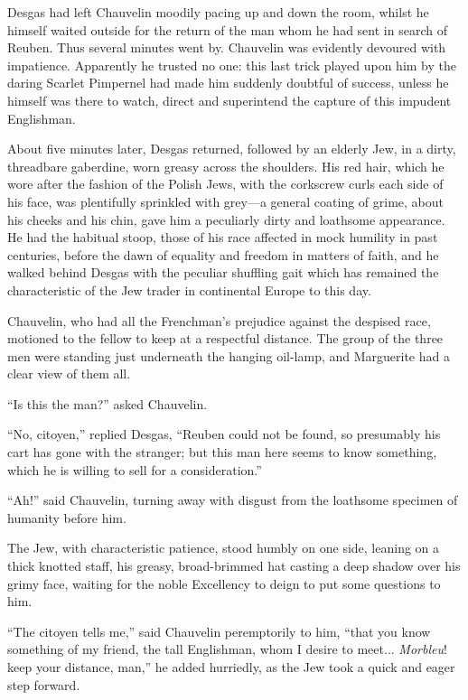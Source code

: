 \documentclass[paper=5.5in:8.5in,BCOR=7mm,twoside,DIV=calc,12pt,usegeometry,chapterprefix,endperiod,headings=big]{scrbook}
\begin{document}
Desgas had left Chauvelin moodily pacing up and down the room, whilst he himself waited outside for the return of the man whom he had sent in search of Reuben. Thus several minutes went by. Chauvelin was evidently devoured with impatience. Apparently he trusted no one: this last trick played upon him by the daring Scarlet Pimpernel had made him suddenly doubtful of success, unless he himself was there to watch, direct and superintend the capture of this impudent Englishman.

About five minutes later, Desgas returned, followed by an elderly Jew, in a dirty, threadbare gaberdine, worn greasy across the shoulders. His red hair, which he wore after the fashion of the Polish Jews, with the corkscrew curls each side of his face, was plentifully sprinkled with grey---a general coating of grime, about his cheeks and his chin, gave him a peculiarly dirty and loathsome appearance. He had the habitual stoop, those of his race affected in mock humility in past centuries, before the dawn of equality and freedom in matters of faith, and he walked behind Desgas with the peculiar shuffling gait which has remained the characteristic of the Jew trader in continental Europe to this day.

Chauvelin, who had all the Frenchman's prejudice against the despised race, motioned to the fellow to keep at a respectful distance. The group of the three men were standing just underneath the hanging oil-lamp, and Marguerite had a clear view of them all.

\enquote{Is this the man?} asked Chauvelin.

\enquote{No, citoyen,} replied Desgas, \enquote{Reuben could not be found, so presumably his cart has gone with the stranger; but this man here seems to know something, which he is willing to sell for a consideration.}

\enquote{Ah!} said Chauvelin, turning away with disgust from the loathsome specimen of humanity before him.

The Jew, with characteristic patience, stood humbly on one side, leaning on a thick knotted staff, his greasy, broad-brimmed hat casting a deep shadow over his grimy face, waiting for the noble Excellency to deign to put some questions to him.

\enquote{The citoyen tells me,} said Chauvelin peremptorily to him, \enquote{that you know something of my friend, the tall Englishman, whom I desire to meet... \textit{Morbleu}! keep your distance, man,} he added hurriedly, as the Jew took a quick and eager step forward.
\end{document}
